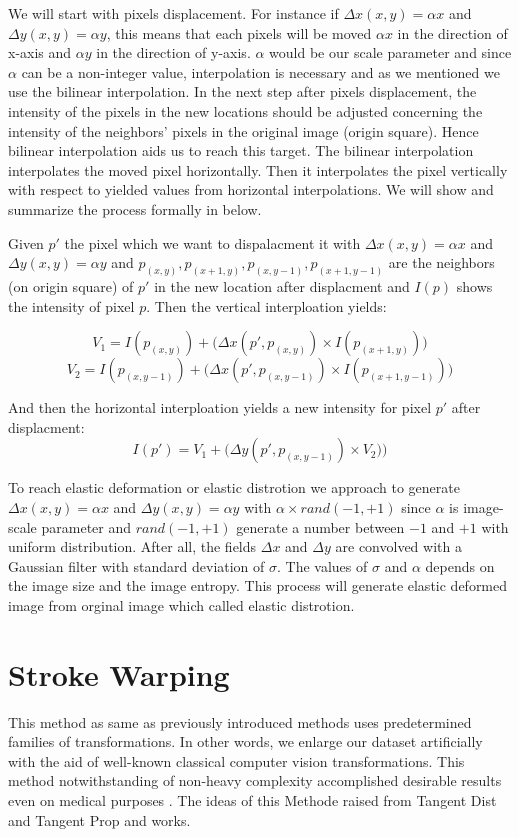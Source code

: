We will start with pixels displacement. For instance if $\Delta x(x,y)= \alpha x$ and $\Delta y(x,y)= \alpha y$, this means that each pixels will be moved $\alpha x$ in the direction of x-axis and
$\alpha y$ in the direction of y-axis. $\alpha$ would be our scale parameter and since $\alpha$ can be a non-integer value, interpolation is necessary and as we mentioned we use the bilinear
interpolation.  In the next step after pixels displacement, the intensity of the pixels in the new locations should be adjusted concerning the intensity of the neighbors' pixels in the original image
(origin square). Hence bilinear interpolation aids us to reach this target. The bilinear interpolation interpolates the moved pixel horizontally. Then it interpolates the pixel vertically with respect
to yielded values from horizontal interpolations. We will show and summarize the process formally in below.

\begin{definition}{}
  Given $p'$ the pixel which we want to dispalacment it with $\Delta x(x,y)= \alpha x$ and $\Delta y(x,y)= \alpha y$ and $p_{(x,y)}, p_{(x+1,y)}, p_{(x,y-1)}, p_{(x+1,y-1)}$ are the neighbors (on
  origin square) of $p'$ in the new location after displacment and $I(p)$ shows the intensity of pixel $p$. Then the vertical interploation yields:

  $$V_1 = I(p_{(x,y)}) + \big( \Delta x(p', p_{(x,y)}) \times I(p_{(x+1,y)}) \big)$$
  $$V_2 = I(p_{(x,y-1)}) + \big( \Delta x(p', p_{(x,y-1)}) \times I(p_{(x+1,y-1)}) \big)$$

  And then the horizontal interploation yields a new intensity for pixel $p'$ after displacment:
  $$I(p') = V_1 + \big( \Delta y(p', p_{(x,y-1)}) \times V_2) \big)$$
\end{definition}

To reach elastic deformation or elastic distrotion we approach to generate $\Delta x(x,y)= \alpha x$ and $\Delta y(x,y)= \alpha y$ with $\alpha \times rand(-1,+1)$ since $\alpha$ is image-scale parameter
and $rand(-1,+1)$ generate a number between $-1$ and $+1$ with uniform distribution. After all, the
fields $\Delta x$ and $\Delta y$ are convolved with a Gaussian filter with standard deviation of
$\sigma$. The values of $\sigma$ and $\alpha$ depends on the image size and the image entropy. This process will generate elastic deformed image from orginal image which called elastic distrotion.


\section{Stroke Warping}
\label{tit:stroke-warping}
This method as same as previously introduced methods uses predetermined families of transformations.
In other words, we enlarge our dataset artificially with the aid of well-known classical computer
vision transformations. This method notwithstanding of non-heavy complexity accomplished desirable
results even on medical purposes \cite{stroke_tumor}. The ideas of this Methode raised from Tangent
Dist and Tangent Prop \cite{stroke_idea_1992} and \cite{stroke_idea_1993} works.

